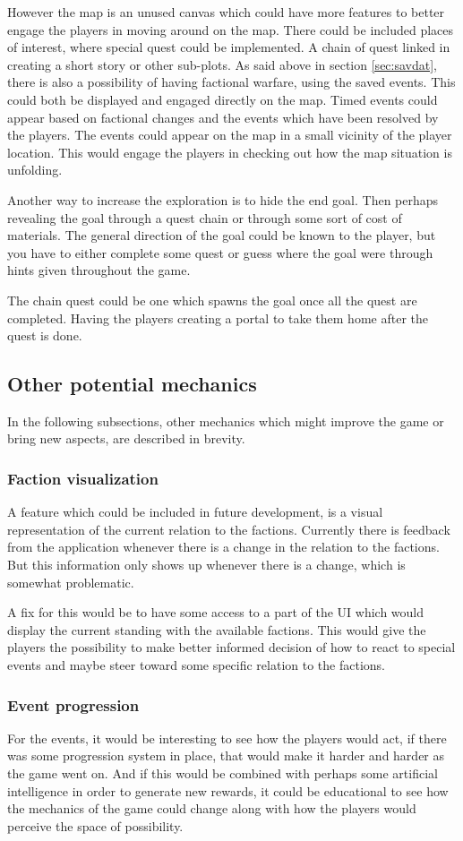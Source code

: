However the map is an unused canvas which could have more features to better engage the players in moving around on the map. 
There could be included places of interest, where special quest could be implemented. A chain of quest linked in creating a short story or other sub-plots. 
As said above in section \ref{sec:savdat}, there is also a possibility of having factional warfare, using the saved events. This could both be displayed and engaged directly on the map. 
Timed events could appear based on factional changes and the events which have been resolved by the players. The events could appear on the map in a small vicinity of the player location. This would engage the players in checking out how the map situation is unfolding. 

Another way to increase the exploration is to hide the end goal. Then perhaps revealing the goal through a quest chain or through some sort of cost of materials. The general direction of the goal could be known to the player, but you have to either complete some quest or guess where the goal were through hints given throughout the game.

The chain quest could be one which spawns the goal once all the quest are completed. Having the players creating a portal to take them home after the quest is done.
\subsection{Other potential mechanics}
In the following subsections, other mechanics which might improve the game or bring new aspects, are described in brevity. 
\subsubsection{Faction visualization}
A feature which could be included in future development, is a visual representation of the current relation to the factions.
Currently there is feedback from the application whenever there is a change in the relation to the factions. But this information only shows up whenever there is a change, which is somewhat problematic. 

A fix for this would be to have some access to a part of the UI which would display the current standing with the available factions. This would give the players the possibility to make better informed decision of how to react to special events and maybe steer toward some specific relation to the factions.

\subsubsection{Event progression}
For the events, it would be interesting to see how the players would act, if there was some progression system in place, that would make it harder and harder as the game went on. And if this would be combined with perhaps some artificial intelligence in order to generate new rewards, it could be educational to see how the mechanics of the game could change along with how the players would perceive the space of possibility.

